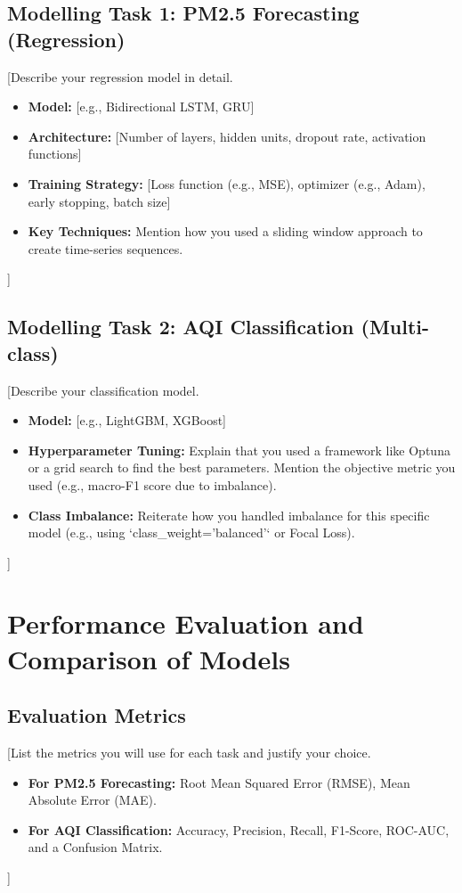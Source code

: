 \documentclass[11pt, a4paper]{article}
\begin{document}
\subsection{Modelling Task 1: PM2.5 Forecasting (Regression)}
[Describe your regression model in detail.
\begin{itemize}
    \item \textbf{Model:} [e.g., Bidirectional LSTM, GRU]
    \item \textbf{Architecture:} [Number of layers, hidden units, dropout rate, activation functions]
    \item \textbf{Training Strategy:} [Loss function (e.g., MSE), optimizer (e.g., Adam), early stopping, batch size]
    \item \textbf{Key Techniques:} Mention how you used a sliding window approach to create time-series sequences.
\end{itemize}]

\subsection{Modelling Task 2: AQI Classification (Multi-class)}
[Describe your classification model.
\begin{itemize}
    \item \textbf{Model:} [e.g., LightGBM, XGBoost]
    \item \textbf{Hyperparameter Tuning:} Explain that you used a framework like Optuna or a grid search to find the best parameters. Mention the objective metric you used (e.g., macro-F1 score due to imbalance).
    \item \textbf{Class Imbalance:} Reiterate how you handled imbalance for this specific model (e.g., using `class_weight='balanced'` or Focal Loss).
\end{itemize}]

\section{Performance Evaluation and Comparison of Models}

\subsection{Evaluation Metrics}
[List the metrics you will use for each task and justify your choice.
\begin{itemize}
    \item \textbf{For PM2.5 Forecasting:} Root Mean Squared Error (RMSE), Mean Absolute Error (MAE).
    \item \textbf{For AQI Classification:} Accuracy, Precision, Recall, F1-Score, ROC-AUC, and a Confusion Matrix.
\end{itemize}]
\end{document}
